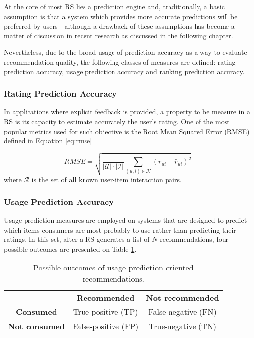 At the core of most RS lies a prediction engine and, traditionally, a basic assumption is that a system which provides more accurate predictions will be preferred by users - although a drawback of these assumptions has become a matter of discussion in recent research as discussed in the following chapter. 

Nevertheless, due to the broad usage of prediction accuracy as a way to evaluate recommendation quality, the following classes of measures are defined: rating prediction accuracy, usage prediction accuracy and ranking prediction accuracy.

\subsubsection{Rating Prediction Accuracy}

In applications where explicit feedback is provided, a property to be measure in a RS is its capacity to estimate accurately the user's rating. One of the most popular metrics used for such objective is the Root Mean Squared Error (RMSE)  defined in Equation \ref{eq:rmse}

\begin{equation}
\label{eq:rmse}
    RMSE = \sqrt{\frac{1}{|\mathcal{U}| \cdot |\mathcal{I}|}\sum_{(u,i) \in \mathcal{K}}(r_{ui} - \hat{r}_{ui})^2}
\end{equation} where $\mathcal{R}$ is the set of all known user-item interaction pairs.

\subsubsection{Usage Prediction Accuracy}

Usage prediction measures are employed on systems that are designed to predict which items consumers are most probably to use rather than predicting their ratings. In this set, after a RS generates a list of $N$ recommendations, four possible outcomes are presented on Table \ref{tab:usage_table}.

\begin{table}[h]
	\centering
	\begin{tabular}{@{}ccc@{}}
		& \textbf{Recommended}                     & \textbf{Not recommended}                 \\ 
		\multicolumn{1}{c|}{\textbf{Consumed}}     & \multicolumn{1}{c|}{True-positive (TP)}  & \multicolumn{1}{c|}{False-negative (FN)} \\ 
		\multicolumn{1}{c|}{\textbf{Not consumed}} & \multicolumn{1}{c|}{False-positive (FP)} & \multicolumn{1}{c|}{True-negative (TN)}  \\ 
	\end{tabular}
	\caption{Possible outcomes of usage prediction-oriented recommendations.}
	\label{tab:usage_table}
\end{table}

